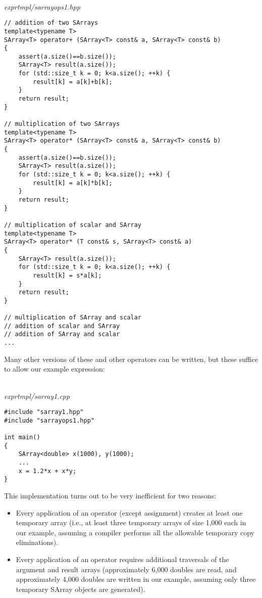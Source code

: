 \hspace*{\fill} \\ %
\noindent
\textit{exprtmpl/sarrayops1.hpp}
\begin{lstlisting}[style=styleCXX]
// addition of two SArrays
template<typename T>
SArray<T> operator+ (SArray<T> const& a, SArray<T> const& b)
{
	assert(a.size()==b.size());
	SArray<T> result(a.size());
	for (std::size_t k = 0; k<a.size(); ++k) {
		result[k] = a[k]+b[k];
	}
	return result;
}

// multiplication of two SArrays
template<typename T>
SArray<T> operator* (SArray<T> const& a, SArray<T> const& b)
{
	assert(a.size()==b.size());
	SArray<T> result(a.size());
	for (std::size_t k = 0; k<a.size(); ++k) {
		result[k] = a[k]*b[k];
	}
	return result;
}

// multiplication of scalar and SArray
template<typename T>
SArray<T> operator* (T const& s, SArray<T> const& a)
{
	SArray<T> result(a.size());
	for (std::size_t k = 0; k<a.size(); ++k) {
		result[k] = s*a[k];
	}
	return result;
}

// multiplication of SArray and scalar
// addition of scalar and SArray
// addition of SArray and scalar
...
\end{lstlisting}

Many other versions of these and other operators can be written, but these suffice to allow our example expression:

\hspace*{\fill} \\ %
\noindent
\textit{exprtmpl/sarray1.cpp}
\begin{lstlisting}[style=styleCXX]
#include "sarray1.hpp"
#include "sarrayops1.hpp"

int main()
{
	SArray<double> x(1000), y(1000);
	...
	x = 1.2*x + x*y;
}
\end{lstlisting}

This implementation turns out to be very inefficient for two reasons:

\begin{itemize}
\item 
Every application of an operator (except assignment) creates at least one temporary array (i.e., at least three temporary arrays of size 1,000 each in our example, assuming a compiler performs all the allowable temporary copy eliminations).

\item 
Every application of an operator requires additional traversals of the argument and result arrays (approximately 6,000 doubles are read, and approximately 4,000 doubles are written in our example, assuming only three temporary SArray objects are generated).
\end{itemize}

